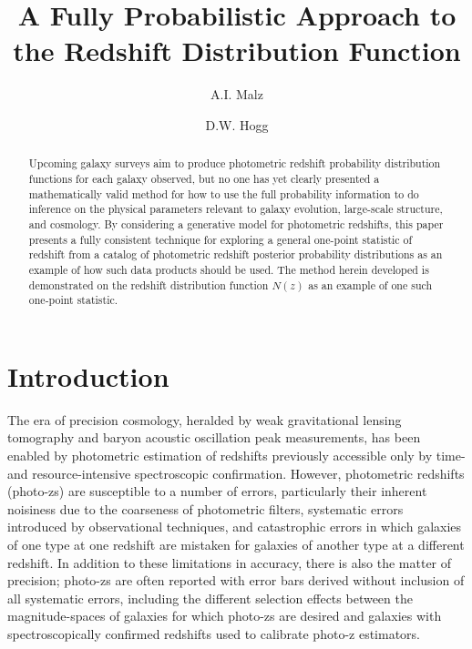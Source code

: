 \documentclass[preprint]{aastex}
\begin{document}
\title{A Fully Probabilistic Approach to the Redshift Distribution Function}

\author{A.I. Malz}

\author{D.W. Hogg}


\begin{abstract}
Upcoming galaxy surveys aim to produce photometric redshift probability 
distribution functions for each galaxy observed, but no one has yet clearly 
presented a mathematically valid method for how to use the full probability 
information to do inference on the physical parameters relevant to galaxy 
evolution, large-scale structure, and cosmology.  By considering a generative 
model for photometric redshifts, this paper presents a fully consistent 
technique for exploring a general one-point statistic of redshift from a 
catalog of photometric redshift posterior probability distributions as an 
example of how such data products should be used.  The method herein developed 
is demonstrated on the redshift distribution function $N(z)$ as an example of 
one such one-point statistic.
\end{abstract}


\clearpage
\section{Introduction}
\label{sec:intro}

The era of precision cosmology, heralded by weak gravitational lensing 
tomography and baryon acoustic oscillation peak measurements, has been enabled 
by photometric estimation of redshifts previously accessible only by time- and 
resource-intensive spectroscopic confirmation.  However, photometric redshifts 
(photo-zs) are susceptible to a number of errors, particularly their inherent 
noisiness due to the coarseness of photometric filters, systematic errors 
introduced by observational techniques, and catastrophic errors in which 
galaxies of one type at one redshift are mistaken for galaxies of another type 
at a different redshift.  In addition to these limitations in accuracy, there 
is also the matter of precision; photo-zs are often reported with error bars 
derived without inclusion of all systematic errors, including the different 
selection effects between the magnitude-spaces of galaxies for which photo-zs 
are desired and galaxies with spectroscopically confirmed redshifts used to 
calibrate photo-z estimators.
\end{document}
